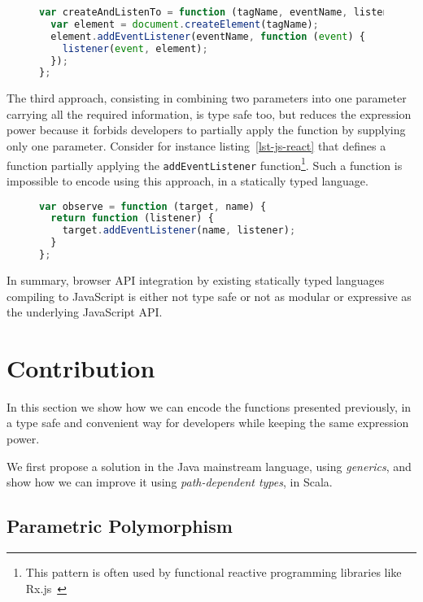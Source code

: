 \documentclass{llncs}
\newcommand{\jscode}[1]{\lstinline[language=JavaScript]|#1|}
\begin{document}
\begin{figure}
\begin{lstlisting}[label=lst-js-comb,language=JavaScript]
var createAndListenTo = function (tagName, eventName, listener) {
  var element = document.createElement(tagName);
  element.addEventListener(eventName, function (event) {
    listener(event, element);
  });
};
\end{lstlisting}
\end{figure}

The third approach, consisting in combining two parameters into one parameter carrying all the required information, is type safe too, but reduces the expression power because it forbids developers to partially apply the function by supplying only one parameter. Consider for instance listing~\ref{lst-js-react} that defines a function partially applying the \jscode{addEventListener} function\footnote{This pattern is often used by functional reactive programming libraries like Rx.js~\cite{liberty2011reactive}}. Such a function is impossible to encode using this approach, in a statically typed language.

\begin{figure}
\begin{lstlisting}[label=lst-js-react,language=JavaScript]
var observe = function (target, name) {
  return function (listener) {
    target.addEventListener(name, listener);
  }
};
\end{lstlisting}
\end{figure}

In summary, browser API integration by existing statically typed languages compiling to JavaScript is either not type safe or not as modular or expressive as the underlying JavaScript API.

\section{Contribution}
\label{sec-contribution}

In this section we show how we can encode the functions presented previously, in a type safe and convenient way for developers while keeping the same expression power.

We first propose a solution in the Java mainstream language, using \emph{generics}, and show how we can improve it using \emph{path-dependent types}, in Scala.

\subsection{Parametric Polymorphism}
\end{document}
